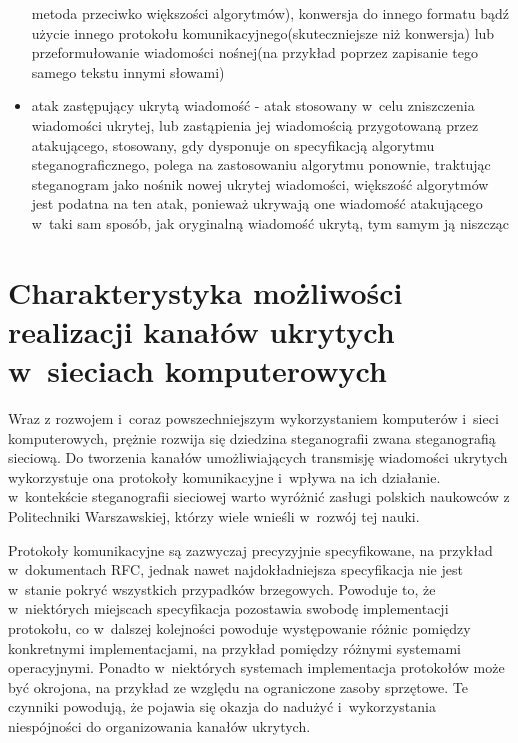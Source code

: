 \documentclass[a4paper, twoside, 12pt]{report}
\begin{document}
\begin{itemize}
                metoda przeciwko większości algorytmów), konwersja do innego formatu
                bądź użycie innego protokołu komunikacyjnego(skuteczniejsze niż konwersja) lub
                przeformułowanie wiadomości nośnej(na przykład poprzez zapisanie tego samego tekstu
                innymi słowami)
            \item atak zastępujący ukrytą wiadomość - atak stosowany w~celu zniszczenia
                wiadomości ukrytej, lub zastąpienia jej wiadomością przygotowaną przez atakującego,
                stosowany, gdy dysponuje on specyfikacją algorytmu steganograficznego,
                polega na zastosowaniu algorytmu ponownie, traktując steganogram jako nośnik
                nowej ukrytej wiadomości, większość algorytmów jest podatna na ten
                atak, ponieważ ukrywają one wiadomość atakującego w~taki sam sposób,
                jak oryginalną wiadomość ukrytą, tym samym ją niszcząc
        \end{itemize}


\chapter{Charakterystyka możliwości realizacji kanałów ukrytych w~sieciach komputerowych}
    Wraz z rozwojem i~coraz powszechniejszym wykorzystaniem komputerów i~sieci
    komputerowych, prężnie rozwija się dziedzina steganografii zwana steganografią
    sieciową. Do tworzenia kanałów umożliwiających transmisję wiadomości ukrytych
    wykorzystuje ona protokoły komunikacyjne i~wpływa na ich działanie. w~kontekście
    steganografii sieciowej warto wyróżnić zasługi polskich naukowców z Politechniki
    Warszawskiej, którzy wiele wnieśli w~rozwój tej nauki\cite{STEGANOGRAFIASIECIOWAART}.

    Protokoły komunikacyjne są zazwyczaj
    precyzyjnie specyfikowane, na przykład w~dokumentach RFC, jednak nawet najdokładniejsza
    specyfikacja nie jest w~stanie pokryć wszystkich przypadków brzegowych. Powoduje
    to, że w~niektórych miejscach specyfikacja pozostawia swobodę implementacji protokołu,
    co w~dalszej kolejności powoduje występowanie różnic pomiędzy konkretnymi
    implementacjami, na przykład pomiędzy różnymi systemami operacyjnymi. Ponadto
    w~niektórych systemach implementacja protokołów może być okrojona, na przykład
    ze względu na ograniczone zasoby sprzętowe. Te czynniki
    powodują, że pojawia się okazja do nadużyć i~wykorzystania niespójności do organizowania
    kanałów ukrytych.
\end{document}
